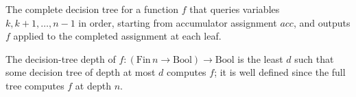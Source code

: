 \begin{definition}
\label{DecisionTree.buildFull}
\leanok
{}
The complete decision tree for a function $f$ that queries variables
$k, k+1, \dots, n-1$ in order, starting from accumulator assignment $acc$, and
outputs $f$ applied to the completed assignment at each leaf.
\end{definition}

\begin{definition}
\label{dtDepth}
\leanok
{}
The decision-tree depth of $f : (\mathrm{Fin}\,n \to \mathrm{Bool}) \to
\mathrm{Bool}$ is the least $d$ such that some decision tree of depth at most $d$
computes $f$; it is well defined since the full tree computes $f$ at depth $n$.
\end{definition}
